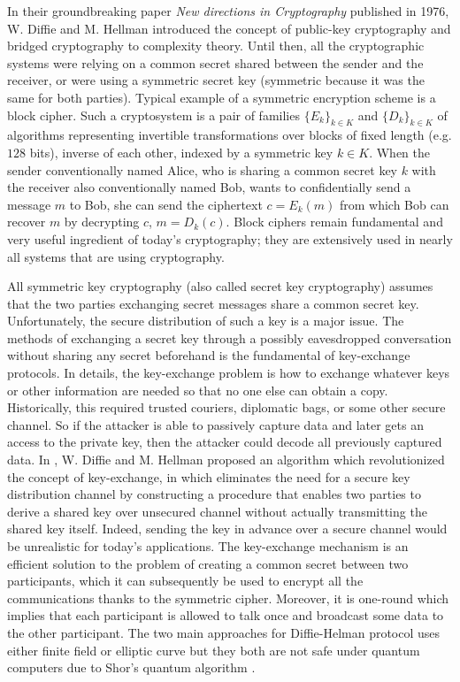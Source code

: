 In their groundbreaking paper \textit{New directions in Cryptography} \cite{1055638} published in 1976, W. Diffie and M. Hellman introduced the concept of public-key cryptography and bridged cryptography to complexity theory. Until then, all the cryptographic systems were relying on a common secret shared between the sender and the receiver, or were using a symmetric secret key (symmetric because it was the same for both parties). Typical example of a symmetric encryption scheme is a block cipher. Such a cryptosystem is a pair of families $\{E_k\}_{k \in K}$ and $\{D_k\}_{k \in K}$ of algorithms representing invertible transformations over blocks of fixed length (e.g. $128$ bits), inverse of each other, indexed by a symmetric key $k \in K$. When the sender conventionally named Alice, who is sharing a common secret key $k$ with the receiver also conventionally named Bob, wants to confidentially send a message $m$ to Bob, she can send the ciphertext $c = E_k(m)$ from which Bob can recover $m$ by decrypting $c$, $m = D_k(c)$. Block ciphers remain fundamental and very useful ingredient of today's cryptography; they are extensively used in nearly all systems that are using cryptography.


All symmetric key cryptography (also called secret key cryptography) assumes that the two parties exchanging secret messages share a common secret key. Unfortunately, the secure distribution of such a key is a major issue. The methods of exchanging a secret key through a possibly eavesdropped conversation without sharing any secret beforehand is the fundamental of key-exchange protocols. In details, the key-exchange problem is how to exchange whatever keys or other information are needed so that no one else can obtain a copy. Historically, this required trusted couriers, diplomatic bags, or some other secure channel. So if the attacker is able to passively capture data and later gets an access to the private key, then the attacker could decode all previously captured data. In \cite{1055638}, W. Diffie and M. Hellman proposed an algorithm which revolutionized the concept of key-exchange, in which eliminates the need for a secure key distribution channel by constructing a procedure that enables two parties to derive a shared key over unsecured channel without actually transmitting the shared key itself. Indeed, sending the key in advance over a secure channel would be unrealistic for today's applications. The key-exchange mechanism is an efficient solution to the problem of creating a common secret between two participants, which it can subsequently be used to encrypt all the communications thanks to the symmetric cipher. Moreover, it is one-round which implies that each participant is allowed to talk once and broadcast some data to the other participant. The two main approaches for Diffie-Helman protocol uses either finite field or elliptic curve but they both are not safe under quantum computers due to Shor's quantum algorithm \cite{Shor:1997:PAP:264393.264406}.

